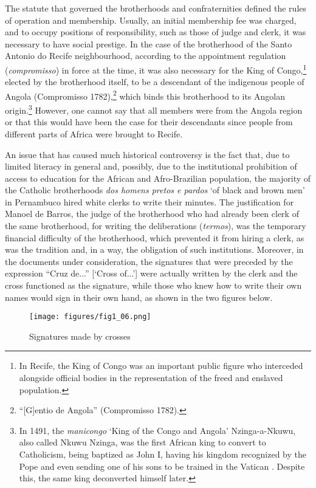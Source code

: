\documentclass[output=paper,colorlinks,citecolor=brown]{langscibook}
\begin{document}
The statute that governed the brotherhoods and confraternities defined the rules of operation and membership. Usually, an initial membership fee was charged, and to occupy positions of responsibility, such as those of judge and clerk, it was necessary to have social prestige. In the case of the brotherhood of the Santo Antonio do Recife neighbourhood, according to the appointment regulation (\emph{compromisso}) in force at the time, it was also necessary for the King of Congo,\footnote{In Recife, the King of Congo was an important public figure who interceded alongside official bodies in the representation of the freed and enslaved population.} elected by the brotherhood itself, to be a descendant of the indigenous people of Angola (Compromisso 1782),\footnote{“[G]entio de Angola” (Compromisso 1782).} which binds this brotherhood to its Angolan origin.\footnote{In 1491, the \emph{manicongo} ‘King of the Congo and Angola’ Nzinga-a-Nkuwu, also called Nkuwu Nzinga, was the first African king to convert to Catholicism, being baptized as John I, having his kingdom recognized by the Pope and even sending one of his sons to be trained in the Vatican \citep{Souza_2002}. Despite this, the same king deconverted himself later.} However, one cannot say that all members were from the Angola region or that this would have been the case for their descendants since people from different parts of Africa were brought to Recife.

An issue that has caused much historical controversy is the fact that, due to limited literacy in general and, possibly, due to the institutional prohibition of access to education for the African and Afro-Brazilian population, the majority of the Catholic brotherhoods \emph{dos homens pretos e pardos} ‘of black and brown men’ in Pernambuco hired white clerks to write their minutes. The justification for Manoel de Barros, the judge of the brotherhood who had already been clerk of the same brotherhood, for writing the deliberations (\emph{termos}), was the temporary financial difficulty of the brotherhood, which prevented it from hiring a clerk, as was the tradition and, in a way, the obligation of such institutions. Moreover, in the documents under consideration, the signatures that were preceded by the expression “Cruz de...” [‘Cross of...’] were actually written by the clerk and the cross functioned as the signature, while those who knew how to write their own names would sign in their own hand, as shown in the two figures below.

\begin{figure}[!ht]
    \centering
    \texttt{[image: figures/fig1\_06.png]}
    \caption{Signatures made by crosses}
    \label{fig:fig1_06}
\end{figure}
\end{document}
